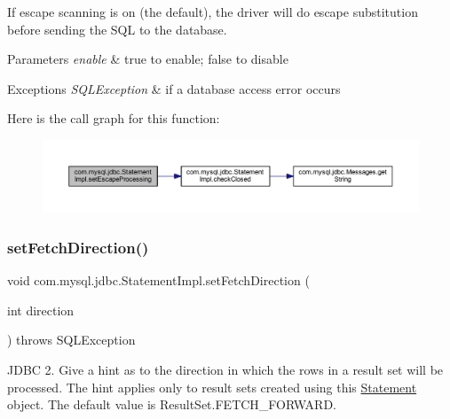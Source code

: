 If escape scanning is on (the default), the driver will do escape substitution before sending the S\+QL to the database.


\begin{DoxyParams}{Parameters}
{\em enable} & true to enable; false to disable\\
\hline
\end{DoxyParams}

\begin{DoxyExceptions}{Exceptions}
{\em S\+Q\+L\+Exception} & if a database access error occurs \\
\hline
\end{DoxyExceptions}
Here is the call graph for this function\+:
\nopagebreak
\begin{figure}[H]
\begin{center}
\leavevmode
\includegraphics[width=350pt]{classcom_1_1mysql_1_1jdbc_1_1_statement_impl_abf630b98fd3807a2973262747e98e9fd_cgraph}
\end{center}
\end{figure}
\mbox{\label{classcom_1_1mysql_1_1jdbc_1_1_statement_impl_aebc30908694e5ae2bc3cec1738bbf2e4}} 
\subsubsection{\texorpdfstring{set\+Fetch\+Direction()}{setFetchDirection()}}
{\footnotesize\ttfamily void com.\+mysql.\+jdbc.\+Statement\+Impl.\+set\+Fetch\+Direction (\begin{DoxyParamCaption}\item[{int}]{direction }\end{DoxyParamCaption}) throws S\+Q\+L\+Exception}

J\+D\+BC 2. Give a hint as to the direction in which the rows in a result set will be processed. The hint applies only to result sets created using this \mbox{\hyperlink{interfacecom_1_1mysql_1_1jdbc_1_1_statement}{Statement}} object. The default value is Result\+Set.\+F\+E\+T\+C\+H\+\_\+\+F\+O\+R\+W\+A\+RD.


